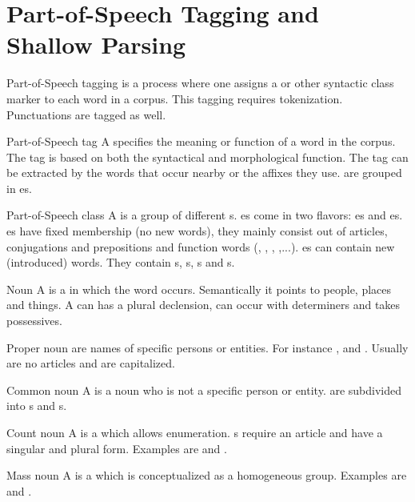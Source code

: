 \section{Part-of-Speech Tagging and Shallow Parsing}
\begin{df}{Part-of-Speech tagging}
\sb{} is a process where one assigns a \pos{} or other syntactic class marker to each word in a corpus. This tagging requires tokenization. Punctuations are tagged as well.
\end{df}
\begin{df}{Part-of-Speech tag}
A \sb{} specifies the meaning or function of a word in the corpus. The tag is based on both the syntactical and morphological function. The tag can be extracted by the words that occur nearby or the affixes they use. \sb{} are grouped in es.
\end{df}
\begin{df}{Part-of-Speech class}
A \sb{} is a group of different s. \sb{}es come in two flavors: es and es. es have fixed membership (no new words), they mainly consist out of articles, conjugations and prepositions and function words (, , , ,...). es can contain new (introduced) words. They contain s, s, s and s.
\end{df}
\begin{df}{Noun}
A \sb{} is a  in which the word occurs. Semantically it points to people, places and things. A \sb{} can has a plural declension, can occur with determiners and takes possessives.
\end{df}
\begin{df}{Proper noun}
\sb{} are names of specific persons or entities. For instance ,  and . Usually \sb{} are no articles and are capitalized.
\end{df}
\begin{df}{Common noun}
A \sb{} is a noun who is not a specific person or entity. \sb{} are subdivided into s and s.
\end{df}
\begin{df}{Count noun}
A \sb{} is a  which allows enumeration. \sb{}s require an article and have a singular and plural form. Examples are  and .
\end{df}
\begin{df}{Mass noun}
A \sb{} is a  which is conceptualized as a homogeneous group. Examples are  and .
\end{df}
